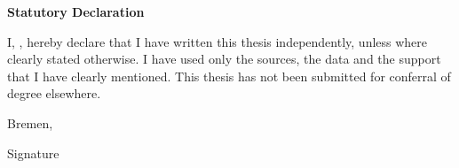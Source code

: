 \thispagestyle{empty}

\vspace*{\fill}

\begin{center}
  \LARGE {
    \textbf{Statutory Declaration}
  }
\end{center}

\vspace*{\baselineskip}

{
  \noindent
  I, {\makeatletter\@author\makeatother}, hereby declare that I have written this thesis independently, unless where clearly stated otherwise. 
  I have used only the sources, the data and the support that I have clearly mentioned. 
  This thesis has not been submitted for conferral of degree elsewhere.
}

\vspace*{\baselineskip}
\vspace*{\baselineskip}
\vspace*{\baselineskip}
\vspace*{\baselineskip}
\vspace*{\baselineskip}

{
  \noindent Bremen, {\makeatletter\@date\makeatother}
}

\vspace*{\baselineskip}
\vspace*{\baselineskip}
\vspace*{\baselineskip}
\vspace*{\baselineskip}

\noindent Signature \hrulefill

\vspace*{\fill}

\clearpage
\setcounter{page}{1}

\newpage

